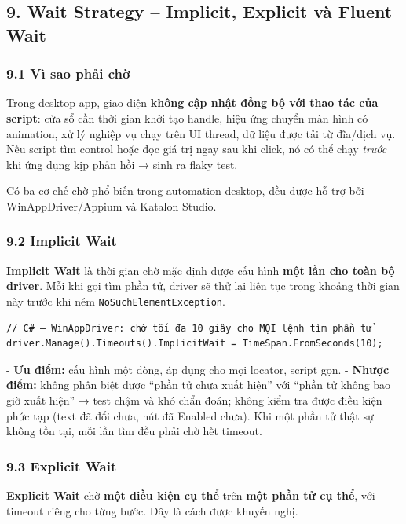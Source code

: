 \subsection{9. Wait Strategy – Implicit, Explicit và Fluent Wait}

\subsubsection{9.1 Vì sao phải chờ}

Trong desktop app, giao diện \textbf{không cập nhật đồng bộ với thao tác của script}: cửa sổ cần thời gian khởi tạo handle, hiệu ứng chuyển màn hình có animation, xử lý nghiệp vụ chạy trên UI thread, dữ liệu được tải từ đĩa/dịch vụ. Nếu script tìm control hoặc đọc giá trị ngay sau khi click, nó có thể chạy \textit{trước} khi ứng dụng kịp phản hồi → sinh ra flaky test.

Có ba cơ chế chờ phổ biến trong automation desktop, đều được hỗ trợ bởi WinAppDriver/Appium và Katalon Studio.

\subsubsection{9.2 Implicit Wait}

\textbf{Implicit Wait} là thời gian chờ mặc định được cấu hình \textbf{một lần cho toàn bộ driver}. Mỗi khi gọi tìm phần tử, driver sẽ thử lại liên tục trong khoảng thời gian này trước khi ném \texttt{NoSuchElementException}.

\begin{lstlisting}
// C# – WinAppDriver: chờ tối đa 10 giây cho MỌI lệnh tìm phần tử
driver.Manage().Timeouts().ImplicitWait = TimeSpan.FromSeconds(10);
\end{lstlisting}


- \textbf{Ưu điểm:} cấu hình một dòng, áp dụng cho mọi locator, script gọn.
- \textbf{Nhược điểm:} không phân biệt được “phần tử chưa xuất hiện” với “phần tử không bao giờ xuất hiện” → test chậm và khó chẩn đoán; không kiểm tra được điều kiện phức tạp (text đã đổi chưa, nút đã Enabled chưa). Khi một phần tử thật sự không tồn tại, mỗi lần tìm đều phải chờ hết timeout.

\subsubsection{9.3 Explicit Wait}

\textbf{Explicit Wait} chờ \textbf{một điều kiện cụ thể} trên \textbf{một phần tử cụ thể}, với timeout riêng cho từng bước. Đây là cách được khuyến nghị.

